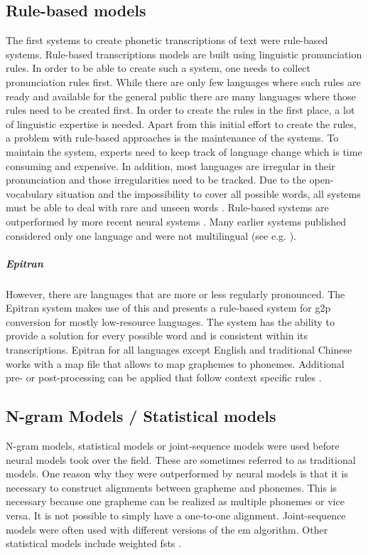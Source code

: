 \subsection{Rule-based models}
The first systems to create phonetic transcriptions of text were rule-based systems. Rule-based transcriptions models are built using linguistic pronunciation rules. In order to be able to create such a system, one needs to collect pronunciation rules first. While there are only few languages where such rules are ready and available for the general public there are many languages where those rules need to be created first. In order to create the rules in the first place, a lot of linguistic expertise is needed. Apart from this initial effort to create the rules, a problem with rule-based approaches is the maintenance of the systems. To maintain the system, experts need to keep track of language change which is time consuming and expensive. In addition, most languages are irregular in their pronunciation and those irregularities need to be tracked. Due to the open-vocabulary situation and the impossibility to cover all possible words, all systems must be able to deal with rare and unseen words \citep{Rao2015GraphemetophonemeCU, ney-joint-sequence2008}. Rule-based systems are outperformed by more recent neural systems \citep{gorman-etal-2020-sigmorphon, Ashby&Bartley.2021}. Many earlier systems published considered only one language and were not multilingual (see e.g. \citet{rule-based2009}). \subparagraph{Epitran} However, there are languages that are more or less regularly pronounced. The Epitran system makes use of this and presents a rule-based system for \ac{g2p} conversion for mostly low-resource languages. The system has the ability to provide a solution for every possible word and is consistent within its transcriptions. Epitran for all languages except English and traditional Chinese works with a map file that allows to map graphemes to phonemes. Additional pre- or post-processing can be applied that follow context specific rules \citep{mortensen-etal-2018-epitran}.

\citep{Rao2015GraphemetophonemeCU}

\citep{ney-joint-sequence2008}


\subsection{N-gram Models / Statistical models}
N-gram models, statistical models or joint-sequence models were used before neural models took over the field. These are sometimes referred to as traditional models. One reason why they were outperformed by neural models is that it is necessary to construct alignments between grapheme and phonemes. This is necessary because one grapheme can be realized as multiple phonemes or vice versa. It is not possible to simply have a one-to-one alignment. Joint-sequence models were often used with different versions of the \ac{em} algorithm. Other statistical models include weighted \ac{fst}s \citep{lo-nicolai-2021-linguistic}.


